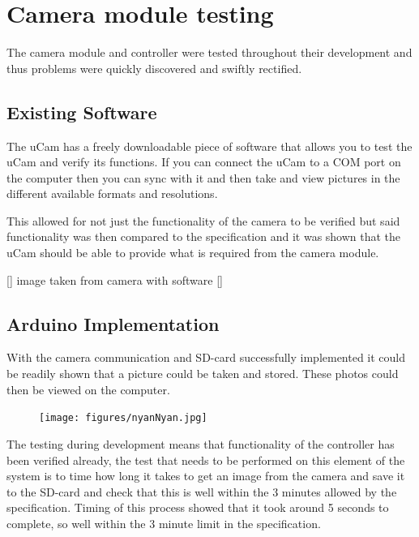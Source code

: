 \section{Camera module testing}

The camera module and controller were tested throughout their development and thus problems were quickly discovered and swiftly rectified.

\subsection{Existing Software}

The uCam has a freely downloadable piece of software that allows you to test the uCam and verify its functions. If you can connect the uCam to a COM port on the computer then you can sync with it and then take and view pictures in the different available formats and resolutions.

This allowed for not just the functionality of the camera to be verified but said functionality was then compared to the specification and it was shown that the uCam should be able to provide what is required from the camera module.

[] image taken from camera with software []

\subsection{Arduino Implementation}

With the camera communication and SD-card successfully implemented it could be readily shown that a picture could be taken and stored. These photos could then be viewed on the computer.

\begin{figure}[H]
        \centering
        \texttt{[image: figures/nyanNyan.jpg]}
        \label{fig:Nyan1}
\end{figure}

The testing during development means that functionality of the controller has been verified already, the test that needs to be performed on this element of the system is to time how long it takes to get an image from the camera and save it to the SD-card and check that this is well within the 3 minutes allowed by the specification. Timing of this process showed that it took around 5 seconds to complete, so well within the 3 minute limit in the specification.

